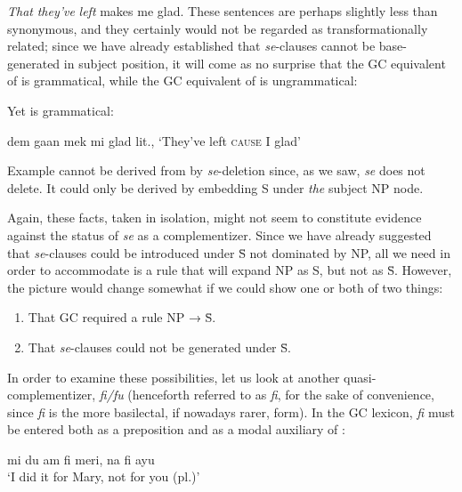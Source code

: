 \ea\label{ex:2:182}
\textit{That} \textit{they've} \textit{left} makes me glad.
\z
These sentences are perhaps slightly less than synonymous, and they certainly would not be regarded as transformationally related; since we have already established that \textit{se}-clauses cannot be base-generated in subject position, it will come as no surprise that the GC equivalent of  is grammatical, while the GC equivalent of  is ungrammatical:

\z

\z

\noindent Yet  is grammatical:

\ea\label{ex:2:185}
 dem gaan mek mi glad
\glt  lit., `They've left \textsc{cause} I glad'
\z

Example  cannot be derived from  by \textit{se}-deletion since, as we saw, \textit{se} does not delete. It could only be derived by embedding S under \textit{the} subject NP node.

Again, these facts, taken in isolation, might not seem to con\-stitute evidence against the status of \textit{se} as a complementizer. Since we have already suggested that \textit{se}-clauses could be introduced under \=S not dominated by NP, all we need in order to accommodate  is a rule that will expand NP as S, but not as \=S. However, the picture would change somewhat if we could show one or both of two things:

\begin{enumerate}
\item That GC required a rule NP → \=S. \label{GCrequirementcondition}
\item That \textit{se}-clauses could not be generated under \=S. \label{GCrequirementcondition2}
\end{enumerate}

In order to examine these possibilities, let us look at another quasi-%
complementizer, \textit{fi/fu} (henceforth referred to as \textit{fi}, for the sake of convenience, since \textit{fi} is the more basilectal, if nowadays rarer, form). In the GC lexicon, \textit{fi} must be entered both as a preposition and as a modal auxiliary of :

\ea\label{ex:2:186}
mi du am fi meri, na fi ayu\\
\glt `I did it for Mary, not for you (pl.)'
\z

